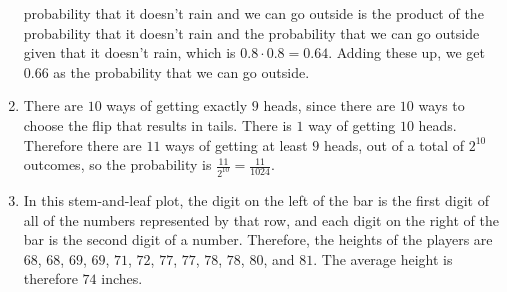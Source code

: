 \documentclass{article}
\begin{document}
\begin{enumerate}
        probability that it doesn't rain and we can go outside is the product of 
        the probability that it doesn't rain and the probability that we can go 
        outside given that it doesn't rain, which is $0.8 \cdot 0.8 = 0.64$.  
        Adding these up, we get $0.66$ as the probability that we can go 
        outside.
    \item There are $10$ ways of getting exactly $9$ heads, since there are $10$ 
        ways to choose the flip that results in tails. There is $1$ way of 
        getting $10$ heads. Therefore there are $11$ ways of getting at least 
        $9$ heads, out of a total of $2^{10}$ outcomes, so the probability is 
        $\frac{11}{2^{10}} = \frac{11}{1024}$.
    \item In this stem-and-leaf plot, the digit on the left of the bar is the 
        first digit of all of the numbers represented by that row, and each 
        digit on the right of the bar is the second digit of a number.  
        Therefore, the heights of the players are $68$, $68$, $69$, $69$, $71$, 
        $72$, $77$, $77$, $78$, $78$, $80$, and $81$. The average height is 
        therefore $74$ inches.
\end{enumerate}
\end{document}
